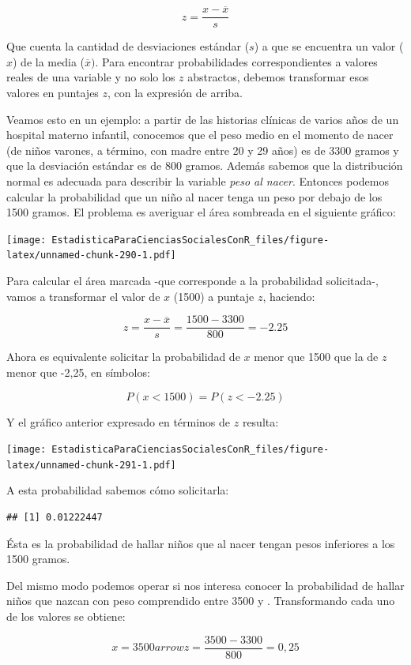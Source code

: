 \documentclass[]{book}
\begin{document}
\[z = \frac{x - \overline{x}}{s}\]

Que cuenta la cantidad de desviaciones estándar (\(s\)) a que se encuentra un valor (\(x\)) de la media (\(\overline{x})\). Para encontrar
probabilidades correspondientes a valores reales de una variable y no
solo los \(z\) abstractos, debemos transformar esos valores en puntajes
\(z\), con la expresión de arriba.

Veamos esto en un ejemplo: a partir de las historias clínicas de varios
años de un hospital materno infantil, conocemos que el peso medio en el
momento de nacer (de niños varones, a término, con madre entre 20 y 29
años) es de 3300 gramos y que la desviación estándar es de 800 gramos. Además sabemos que la distribución normal es adecuada para describir la variable \emph{peso al nacer}. Entonces podemos calcular la probabilidad que un niño al nacer tenga un peso por debajo de los 1500 gramos. El problema es averiguar el área sombreada en el siguiente gráfico:

\texttt{[image: EstadisticaParaCienciasSocialesConR\_files/figure-latex/unnamed-chunk-290-1.pdf]}

Para calcular el área marcada -que corresponde a la probabilidad
solicitada-, vamos a transformar el valor de \(x\) (1500) a puntaje \(z\),
haciendo:

\[z = \frac{x - \overline{x}}{s} = \frac{1500 - 3300}{800} = - 2.25\]

Ahora es equivalente solicitar la probabilidad de \(x\) menor que 1500 que la de \(z\) menor que -2,25, en símbolos:

\[P(x < 1500) = P(z < - 2.25)\]

Y el gráfico anterior expresado en términos de \(z\) resulta:

\texttt{[image: EstadisticaParaCienciasSocialesConR\_files/figure-latex/unnamed-chunk-291-1.pdf]}

A esta probabilidad sabemos cómo solicitarla:

\begin{verbatim}
## [1] 0.01222447
\end{verbatim}

Ésta es la probabilidad de hallar niños que al nacer tengan pesos
inferiores a los 1500 gramos.

Del mismo modo podemos operar si nos interesa conocer la probabilidad de hallar niños que nazcan con peso comprendido entre 3500 y .
Transformando cada uno de los valores se obtiene:

\[x = 3500arrow z = \frac{3500 - 3300}{800} = 0,25\]
\end{document}
